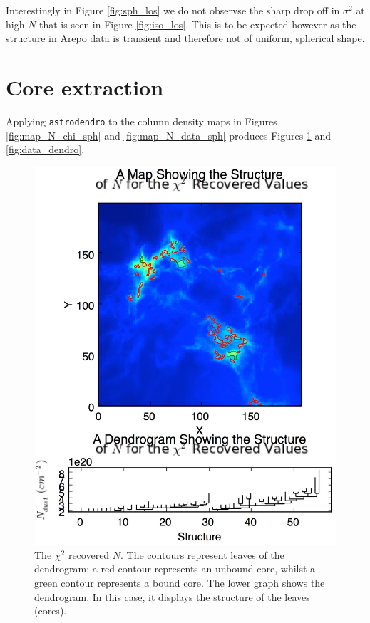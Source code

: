 \documentclass{report}
\begin{document}
Interestingly in Figure \ref{fig:sph_los} we do not observse the sharp drop off in $\sigma^{2}$ at high $N$ that is seen in Figure \ref{fig:iso_los}. This is to be expected however as the structure in Arepo data is transient and therefore not of uniform, spherical shape.

\section{Core extraction}
Applying \texttt{astrodendro} to the column density maps in Figures \ref{fig:map_N_chi_sph} and \ref{fig:map_N_data_sph} produces Figures \ref{fig:chi_dendro} and \ref{fig:data_dendro}.

\begin{figure}[H]
  \includegraphics[width=\linewidth]{../img/N_chi_inp.jpg}
  \caption{The $\chi^{2}$ recovered $N$. The contours represent leaves of the dendrogram: a red contour represents an unbound core, whilst a green contour represents a bound core. The lower graph shows the dendrogram. In this case, it displays the structure of the leaves (cores).}\label{fig:chi_dendro}

\end{figure}
\end{document}
